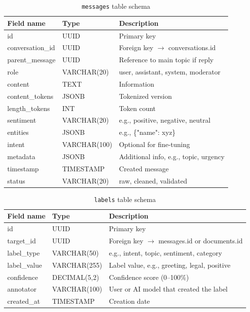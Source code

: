 \documentclass[12pt,oneside,openright,a4paper]{cpe-english-project}
\begin{document}
\begin{table}[H]
\centering
\caption{\texttt{messages} table schema}\label{tbl:db-messages}
\begin{tabular}{|p{}|p{}|p{}|}
\hline
\textbf{Field name} & \textbf{Type} & \textbf{Description} \\ \hline
id & UUID & Primary key \\ \hline
conversation\_id & UUID & Foreign key $\rightarrow$ conversations.id \\ \hline
parent\_message & UUID & Reference to main topic if reply \\ \hline
role & VARCHAR(20) & user, assistant, system, moderator \\ \hline
content & TEXT & Information \\ \hline
content\_tokens & JSONB & Tokenized version \\ \hline
length\_tokens & INT & Token count \\ \hline
sentiment & VARCHAR(20) & e.g., positive, negative, neutral \\ \hline
entities & JSONB & e.g., \{"name": xyz\} \\ \hline
intent & VARCHAR(100) & Optional for fine-tuning \\ \hline
metadata & JSONB & Additional info, e.g., topic, urgency \\ \hline
timestamp & TIMESTAMP & Created message \\ \hline
status & VARCHAR(20) & raw, cleaned, validated \\ \hline
\end{tabular}
\end{table}

\begin{table}[H]
\centering
\caption{\texttt{labels} table schema}\label{tbl:db-labels}
\begin{tabular}{|p{}|p{}|p{}|}
\hline
\textbf{Field name} & \textbf{Type} & \textbf{Description} \\ \hline
id & UUID & Primary key \\ \hline
target\_id & UUID & Foreign key $\rightarrow$ messages.id or documents.id \\ \hline
label\_type & VARCHAR(50) & e.g., intent, topic, sentiment, category \\ \hline
label\_value & VARCHAR(255) & Label value, e.g., greeting, legal, positive \\ \hline
confidence & DECIMAL(5,2) & Confidence score (0--100\%) \\ \hline
annotator & VARCHAR(100) & User or AI model that created the label \\ \hline
created\_at & TIMESTAMP & Creation date \\ \hline
\end{tabular}
\end{table}
\end{document}
